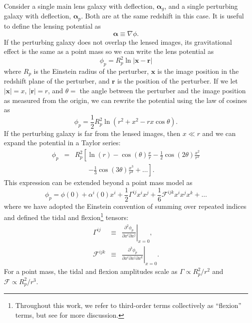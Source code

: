 \documentclass{emulateapj}
\newcommand\x[0]{\mathbf{x}}
\renewcommand\vec[1]{\mathbf{#1}}
\newcommand\al[0]{\boldsymbol{\alpha}}
\newcommand\sF{{\mathcal F}}
\begin{document}
Consider a single main lens galaxy with deflection, $\al_{g}$, and a single perturbing galaxy with deflection, $\al_p$. Both are at the same redshift in this case. It is useful to define the lensing potential as
\begin{equation}
\al \equiv \nabla \phi.
\end{equation}
If the perturbing galaxy does not overlap the lensed images, its gravitational effect is the same as a point mass so we can write the lens potential as
\begin{equation}
\phi_p = R_p^2 \ln \left| \x - \vec{r} \right| 
\end{equation}
where $R_p$ is the Einstein radius of the perturber, $\x$ is the image position in the redshift plane of the perturber, and $\vec{r}$ is the position of the perturber. If we let $|\x| = x$, $|\vec{r}| = r$, and $\theta=$ the angle between the perturber and the image position as measured from the origin, we can rewrite the potential using the law of cosines as
\begin{equation}
\phi_p = \frac{1}{2}R_p^2 \ln(r^2 + x^2 - r x \cos\theta).
\end{equation}
If the perturbing galaxy is far from the lensed images, then $x \ll r$ and we can expand the potential in a Taylor series:
\begin{eqnarray}
\phi_p &=& R_p^2 \left[ \ln(r) - \cos(\theta) \frac{x}{r}  - \frac{1}{2} \cos(2\theta) \frac{x^2}{r^2} \right. \nonumber\\
&& \qquad\left. - \frac{1}{3}\cos(3\theta)\frac{x^3}{r^3}  + \ldots\right].
\end{eqnarray}
This expression can be extended beyond a point mass model as
\begin{equation}
\phi_p = \phi(0) + \alpha^i(0) x^i + \frac{1}{2}\Gamma^{ij} x^i x^j+ \frac{1}{6} \sF^{ijk} x^i x^j x^k + \ldots 
\end{equation}
where we have adopted the Einstein convention of summing over repeated indices and defined the tidal and flexion\footnote{Throughout this work, we refer to  third-order terms collectively as ``flexion'' terms, but see \citet{Bacon06} for more discussion.} tensors:
\begin{eqnarray}
\Gamma^{ij} &\equiv& \left. \frac{\partial^2 \phi_p}{\partial x^i \partial x^j} \right|_{x=0} , \\
\sF^{ijk} &\equiv&  \left. \frac{\partial^3 \phi_p}{\partial x^i \partial x^j \partial x^k} \right|_{x=0} .
\end{eqnarray}
For a point mass, the tidal and flexion amplitudes scale as $\Gamma \propto R_p^2/r^2$ and $\sF \propto R_p^2/r^3$.
\end{document}
